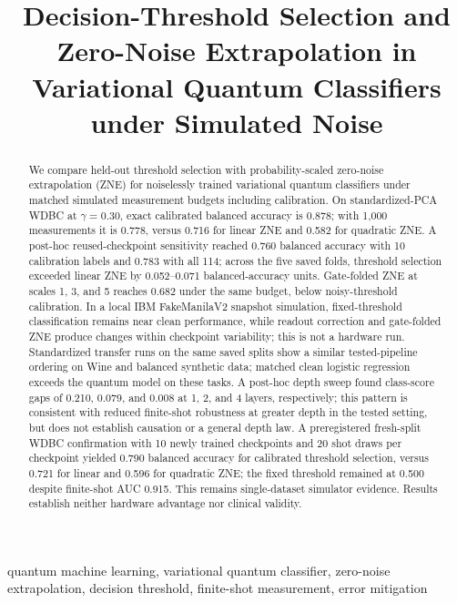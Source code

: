\documentclass[conference]{IEEEtran}
\title{Decision-Threshold Selection and Zero-Noise Extrapolation in Variational Quantum Classifiers under Simulated Noise}
\author{\IEEEauthorblockN{Anonymous Authors}}
\begin{document}
\maketitle
\begin{abstract}
We compare held-out threshold selection with probability-scaled zero-noise extrapolation (ZNE) for noiselessly trained variational quantum classifiers under matched simulated measurement budgets including calibration. On standardized-PCA WDBC at $\gamma=0.30$, exact calibrated balanced accuracy is 0.878; with 1,000 measurements it is 0.778, versus 0.716 for linear ZNE and 0.582 for quadratic ZNE. A post-hoc reused-checkpoint sensitivity reached 0.760 balanced accuracy with 10 calibration labels and 0.783 with all 114; across the five saved folds, threshold selection exceeded linear ZNE by 0.052--0.071 balanced-accuracy units. Gate-folded ZNE at scales 1, 3, and 5 reaches 0.682 under the same budget, below noisy-threshold calibration. In a local IBM FakeManilaV2 snapshot simulation, fixed-threshold classification remains near clean performance, while readout correction and gate-folded ZNE produce changes within checkpoint variability; this is not a hardware run. Standardized transfer runs on the same saved splits show a similar tested-pipeline ordering on Wine and balanced synthetic data; matched clean logistic regression exceeds the quantum model on these tasks. A post-hoc depth sweep found class-score gaps of 0.210, 0.079, and 0.008 at 1, 2, and 4 layers, respectively; this pattern is consistent with reduced finite-shot robustness at greater depth in the tested setting, but does not establish causation or a general depth law. A preregistered fresh-split WDBC confirmation with 10 newly trained checkpoints and 20 shot draws per checkpoint yielded 0.790 balanced accuracy for calibrated threshold selection, versus 0.721 for linear and 0.596 for quadratic ZNE; the fixed threshold remained at 0.500 despite finite-shot AUC 0.915. This remains single-dataset simulator evidence. Results establish neither hardware advantage nor clinical validity.\end{abstract}
\begin{IEEEkeywords}
quantum machine learning, variational quantum classifier, zero-noise extrapolation, decision threshold, finite-shot measurement, error mitigation
\end{IEEEkeywords}
\end{document}
